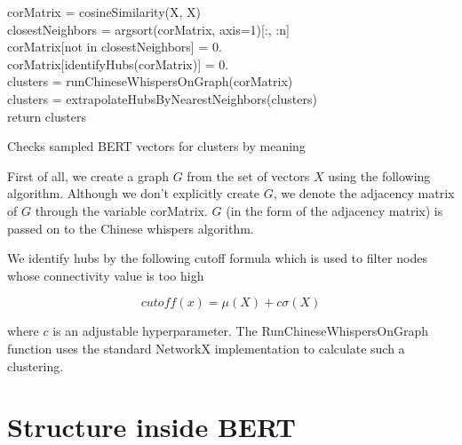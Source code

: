 \documentclass[a4paper,12pt,twoside,openright]{report}
\begin{document}
\begin{algorithm}[H]
\SetAlgoLined
{}

corMatrix = cosineSimilarity(X, X) \\
closestNeighbors = argsort(corMatrix, axis=1)[:, :n] \\
corMatrix[not in closestNeighbors] = 0. \\

corMatrix[identifyHubs(corMatrix)] = 0. \\

clusters = runChineseWhispersOnGraph(corMatrix) \\

clusters = extrapolateHubsByNearestNeighbors(clusters) \\

return clusters

 \caption{Checks sampled BERT vectors for clusters by  meaning}
\end{algorithm}

First of all, we create a graph $G$ from the set of vectors $X$ using the following algorithm.
Although we don't explicitly create $G$, we denote the adjacency matrix of $G$ through the variable corMatrix.
$G$ (in the form of the adjacency matrix) is passed on to the Chinese whispers algorithm.


We identify hubs by the following cutoff formula which is used to filter nodes whose connectivity value is too high

\begin{equation}
cutoff(x) = \mu ( X ) + c \sigma (X)
\end{equation}

where $c$ is an adjustable hyperparameter.
The RunChineseWhispersOnGraph function uses the standard NetworkX implementation \cite{hagberg04} to calculate such a clustering.




\section{Structure inside BERT}
\end{document}
